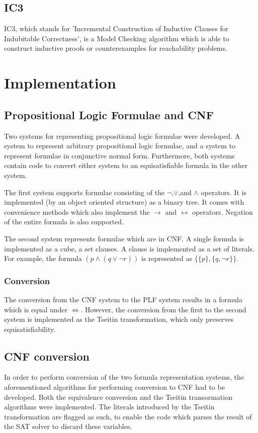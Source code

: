\documentclass[a4paper]{article}
\begin{document}
\subsection{IC3}
IC3, which stands for 'Incremental Construction of Inductive Clauses for Indubitable Correctness', is a Model Checking algorithm which is able to construct inductive proofs or counterexamples for reachability problems.





\section{Implementation}
\subsection{Propositional Logic Formulae and CNF}
Two systems for representing propositional logic formulae were developed. A system to represent arbitrary propositional logic formulae, and a system to represent formulae in conjunctive normal form. Furthermore, both systems contain code to convert either system to an equisatisfiable formula in the other system.

The first system supports formulae consisting of the $\lnot$,$\lor$,and $\land$ operators. It is implemented (by an object oriented structure) as a binary tree. It comes with convenience methods which also implement the $\rightarrow$ and $\leftrightarrow$ operators. Negation of the entire formula is also supported.

The second system represents formulae which are in CNF. A single formula is implemented as a cube, a set clauses. A clause is implemented as a set of literals. For example, the formula $(p \land (q \lor \lnot r))$ is represented as $\{\{p\},\{q,\lnot r\}\}$.
\subsubsection{Conversion}
The conversion from the CNF system to the PLF system results in a formula which is equal under $\Leftrightarrow$. However, the conversion from the first to the second system is implemented as the Tseitin transformation, which only preserves equisatisfiability.

\subsection{CNF conversion}
In order to perform conversion of the two formula representation systems, the aforementioned algorithms for performing conversion to CNF had to be developed. Both the equivalence conversion and the Tseitin transormation algorithms were implemented.  The literals introduced by the Tseitin transformation are flagged as such, to enable the code which parses the result of the SAT solver to discard these variables.
\end{document}
